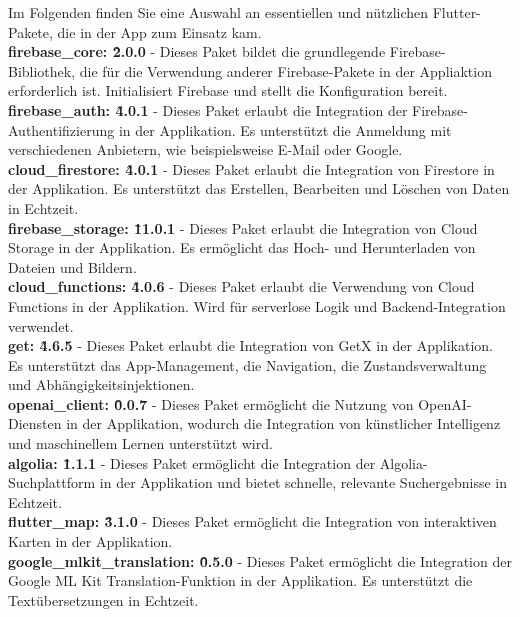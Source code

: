 Im Folgenden finden Sie eine Auswahl an essentiellen und nützlichen Flutter-Pakete, die in der App zum Einsatz kam.
\\
\textbf{firebase\_core: \^2.0.0}\cite{package_firebase_core} - Dieses Paket bildet die grundlegende Firebase-Bibliothek, die für die Verwendung anderer Firebase-Pakete in der Appliaktion erforderlich ist. Initialisiert Firebase und stellt die Konfiguration bereit.
\\
\textbf{firebase\_auth: \^4.0.1}\cite{package_firebase_auth} - Dieses Paket erlaubt die Integration der Firebase-Authentifizierung in der Applikation. Es unterstützt die Anmeldung mit verschiedenen Anbietern, wie beispielsweise E-Mail oder Google.
\\
\textbf{cloud\_firestore: \^4.0.1}\cite{package_cloud_firestore} - Dieses Paket erlaubt die Integration von Firestore in der Applikation. Es unterstützt das Erstellen, Bearbeiten und Löschen von Daten in Echtzeit.
\\
\textbf{firebase\_storage: \^11.0.1}\cite{package_firebase_storage} - Dieses Paket erlaubt die Integration von Cloud Storage in der Applikation. Es ermöglicht das Hoch- und Herunterladen von Dateien und Bildern.
\\
\textbf{cloud\_functions: \^4.0.6}\cite{package_cloud_functions} - Dieses Paket erlaubt die Verwendung von Cloud Functions in der Applikation. Wird für serverlose Logik und Backend-Integration verwendet.
\\
\textbf{get: \^4.6.5}\cite{package_get} - Dieses Paket erlaubt die Integration von GetX in der Applikation. Es unterstützt das App-Management, die Navigation, die Zustandsverwaltung und Abhängigkeitsinjektionen.
\\
\textbf{openai\_client: \^0.0.7}\cite{package_openai_client} - Dieses Paket ermöglicht die Nutzung von OpenAI-Diensten in der Applikation, wodurch die Integration von künstlicher Intelligenz und maschinellem Lernen unterstützt wird.
\\
\textbf{algolia: \^1.1.1}\cite{package_algolia} - Dieses Paket ermöglicht die Integration der Algolia-Suchplattform in der Applikation und bietet schnelle, relevante Suchergebnisse in Echtzeit.
\\
\textbf{flutter\_map: \^3.1.0}\cite{package_flutter_map} - Dieses Paket ermöglicht die Integration von interaktiven Karten in der Applikation.
\\
\textbf{google\_mlkit\_translation: \^0.5.0}\cite{package_google_mlkit_translation} - Dieses Paket ermöglicht die Integration der Google ML Kit Translation-Funktion in der Applikation. Es unterstützt die Textübersetzungen in Echtzeit.
